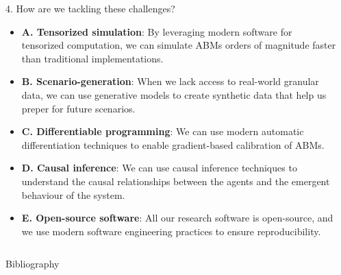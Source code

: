 \documentclass[final,hyperref={pdfpagelabels=false}]{beamer}
\begin{document}
\begin{frame}[t]
\begin{columns}[t]
\begin{column}{.55\textwidth}
    \begin{block}{4. How are we tackling these challenges?}
      \begin{itemize}
        \item \justifying \textbf{A. Tensorized simulation}: By leveraging modern software for tensorized computation, we can simulate ABMs orders of magnitude faster than traditional implementations.
        \item \justifying \textbf{B. Scenario-generation}: When we lack access to real-world granular data, we can use generative models to create synthetic data that help us preper for future scenarios.
        \item \justifying \textbf{C. Differentiable programming}: We can use modern automatic differentiation techniques to enable gradient-based calibration of ABMs.
        \item \justifying \textbf{D. Causal inference}: We can use causal inference techniques to understand the causal relationships between the agents and the emergent behaviour of the system.
        \item \justifying \textbf{E. Open-source software}: All our research software is open-source, and we use modern software engineering practices to ensure reproducibility.

      \end{itemize}
    \end{block}

  \end{column} %



  \begin{column}{.02\textwidth}\end{column} %

\end{columns} %

\begin{minipage}{\textwidth}
  \begin{block}{Bibliography}
    \nocite{*} %
    \linespread{0.928}\selectfont
    \scriptsize{}
  \end{block}
\end{minipage}

\end{frame} %
\end{document}
